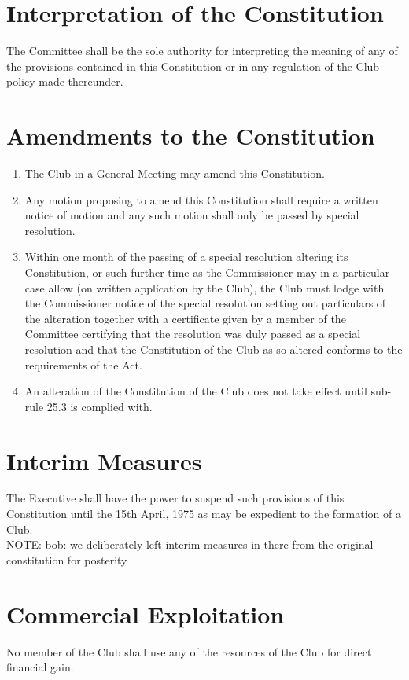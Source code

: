 \documentclass[11pt]{article} %
\begin{document}
\section{Interpretation of the Constitution}
The Committee shall be the sole authority for interpreting the meaning of any of the provisions contained in this Constitution or in any regulation of the Club policy made thereunder.

\section{Amendments to the Constitution}
\begin{enumerate}
	\item The Club in a General Meeting may amend this Constitution.
	\item Any motion proposing to amend this Constitution shall require a written notice of motion and any such motion shall only be passed by special resolution.
	\item Within one month of the passing of a special resolution altering its Constitution, or such further time as the Commissioner may in a particular case allow (on written application by the Club), the Club must lodge with the Commissioner notice of the special resolution setting out particulars of the alteration together with a certificate given by a member of the Committee certifying that the resolution was duly passed as a special resolution and that the Constitution of the Club as so altered conforms to the requirements of the Act.
	\item An alteration of the Constitution of the Club does not take effect until sub-rule 25.3 is complied with.
\end{enumerate}

\section{Interim Measures}
The Executive shall have the power to suspend such provisions of this Constitution until the 15th April, 1975 as may be expedient to the formation of a Club.\\
{\color{Cyan}NOTE:
bob: we deliberately left interim measures in there from the original constitution for posterity
}

\section{Commercial Exploitation}
No member of the Club shall use any of the resources of the Club for direct financial gain.
\end{document}
